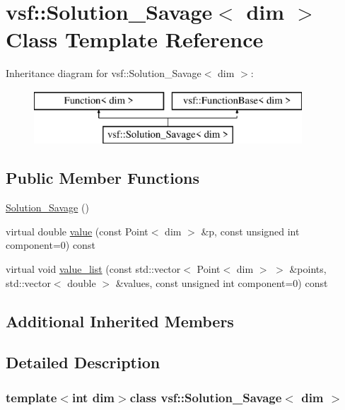 \hypertarget{classvsf_1_1Solution__Savage}{\section{vsf\-:\-:Solution\-\_\-\-Savage$<$ dim $>$ Class Template Reference}
\label{classvsf_1_1Solution__Savage}
}
Inheritance diagram for vsf\-:\-:Solution\-\_\-\-Savage$<$ dim $>$\-:\begin{figure}[H]
\begin{center}
\leavevmode
\includegraphics[height=2.000000cm]{classvsf_1_1Solution__Savage}
\end{center}
\end{figure}
\subsection*{Public Member Functions}
\begin{DoxyCompactItemize}
\item 
\hyperlink{classvsf_1_1Solution__Savage_a3cb39f3c76ce35ecaf75c83a9f8ec396}{Solution\-\_\-\-Savage} ()
\item 
virtual double \hyperlink{classvsf_1_1Solution__Savage_a7cc24cd1892ce82f00e0c8c02700897d}{value} (const Point$<$ dim $>$ \&p, const unsigned int component=0) const 
\item 
virtual void \hyperlink{classvsf_1_1Solution__Savage_a7dd79bf997cb39e1916fb0e28e8a7161}{value\-\_\-list} (const std\-::vector$<$ Point$<$ dim $>$ $>$ \&points, std\-::vector$<$ double $>$ \&values, const unsigned int component=0) const 
\end{DoxyCompactItemize}
\subsection*{Additional Inherited Members}


\subsection{Detailed Description}
\subsubsection*{template$<$int dim$>$class vsf\-::\-Solution\-\_\-\-Savage$<$ dim $>$}

